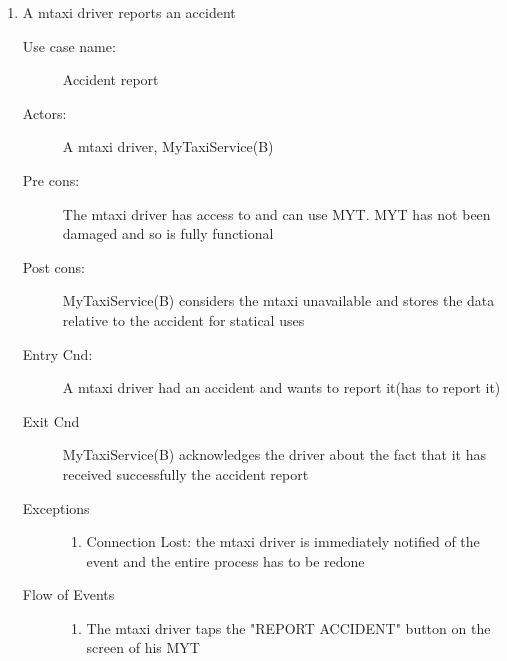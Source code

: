 \documentclass[11pt]{article} %
\begin{document}
\begin{enumerate}
	
	      \item A mtaxi driver reports an accident
		\begin{description}
		        \item [Use case name:] Accident report
		        \item [Actors:] A mtaxi driver, MyTaxiService(B)
		        \item [Pre cons:] The mtaxi driver has access to and can use MYT. MYT has not been damaged and so
		        is fully functional
		        \item [Post cons:] MyTaxiService(B) considers the mtaxi unavailable and stores the data
		        relative to the accident for statical uses
		        \item [Entry Cnd:] A mtaxi driver had an accident and wants to report it(has to report it)
		        \item [Exit Cnd] MyTaxiService(B) acknowledges the driver about the fact that it has received
		        successfully the accident report
		        \item [Exceptions]\hfill
			\begin{enumerate}
			          \item Connection Lost: the mtaxi driver is immediately notified of the event and the entire process has to be redone
			\end{enumerate}
		       \item [Flow of Events]\hfill
			\begin{enumerate}
			          \item The mtaxi driver taps the "REPORT ACCIDENT" button on the screen of his MYT
			\end{enumerate}
		\end{description}
	

\end{enumerate}
\end{document}

